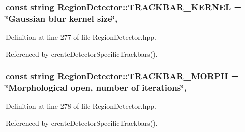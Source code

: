 \hypertarget{classmultiscale_1_1analysis_1_1RegionDetector_a79b72da59c92b368fb7894fe1f424e00}{
\subsubsection[{T\-R\-A\-C\-K\-B\-A\-R\-\_\-\-K\-E\-R\-N\-E\-L}]{\setlength{\rightskip}{0pt plus 5cm}const string Region\-Detector\-::\-T\-R\-A\-C\-K\-B\-A\-R\-\_\-\-K\-E\-R\-N\-E\-L = \char`\"{}Gaussian blur kernel size\char`\"{}\hspace{0.3cm}{\ttfamily [static]}, {\ttfamily [private]}}}\label{classmultiscale_1_1analysis_1_1RegionDetector_a79b72da59c92b368fb7894fe1f424e00}


Definition at line 277 of file Region\-Detector.\-hpp.



Referenced by create\-Detector\-Specific\-Trackbars().

\hypertarget{classmultiscale_1_1analysis_1_1RegionDetector_a0358affd40f13327b10447b7fe938338}{
\subsubsection[{T\-R\-A\-C\-K\-B\-A\-R\-\_\-\-M\-O\-R\-P\-H}]{\setlength{\rightskip}{0pt plus 5cm}const string Region\-Detector\-::\-T\-R\-A\-C\-K\-B\-A\-R\-\_\-\-M\-O\-R\-P\-H = \char`\"{}Morphological open, number of iterations\char`\"{}\hspace{0.3cm}{\ttfamily [static]}, {\ttfamily [private]}}}\label{classmultiscale_1_1analysis_1_1RegionDetector_a0358affd40f13327b10447b7fe938338}


Definition at line 278 of file Region\-Detector.\-hpp.



Referenced by create\-Detector\-Specific\-Trackbars().

